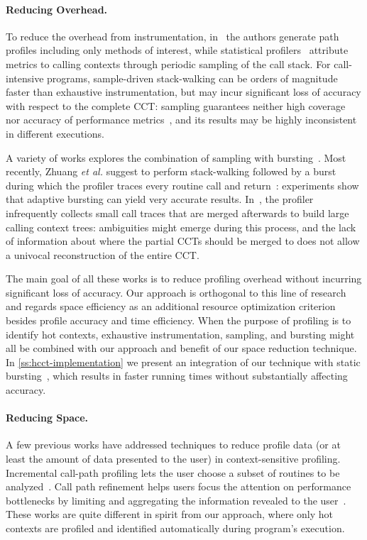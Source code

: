 \paragraph*{Reducing Overhead.} To reduce the overhead from instrumentation, in~\cite{Bernat07} the authors generate path profiles including only methods of interest, while statistical profilers~\cite{Arnold00,Froyd05,Hall93,Whaley00} attribute metrics to calling contexts through periodic sampling of the call stack. For call-intensive programs, sample-driven stack-walking can be orders of magnitude faster than exhaustive instrumentation, but may incur significant loss of accuracy with respect to the complete CCT: sampling guarantees neither high coverage~\cite{Bond07} nor accuracy of performance metrics~\cite{Zhuang06}, and its results may be highly inconsistent in different executions.

\noindent A variety of works explores the combination of sampling with bursting~\cite{Arnold01,Hirzel01,Zhuang06}. Most recently, Zhuang {\em et al.} suggest to perform stack-walking followed by a burst during which the profiler traces every routine call and return~\cite{Zhuang06}: experiments show that adaptive bursting can yield very accurate results. In~\cite{Serrano09}, the profiler infrequently collects small call traces that are merged afterwards to build large calling context trees: ambiguities might emerge during this process, and the lack of information about where the partial CCTs should be merged to does not allow a univocal reconstruction of the entire CCT.

The main goal of all these works is to reduce profiling overhead without incurring significant loss of accuracy. Our approach is orthogonal to this line of research and regards space efficiency as an additional resource optimization criterion besides profile accuracy and time efficiency. When the purpose of profiling is to identify hot contexts, exhaustive instrumentation, sampling, and bursting might all be combined with our approach and benefit of our space reduction technique. In \mysection\ref{ss:hcct-implementation} we present an integration of our technique with static bursting~\cite{Zhuang06}, which results in faster running times without substantially affecting accuracy.

\paragraph*{Reducing Space.} A few previous works have addressed techniques to reduce profile data (or at least the amount of data presented to the user) in context-sensitive profiling. Incremental call-path profiling lets the user choose a subset of routines to be analyzed~\cite{Bernat07}. Call path refinement helps users focus the attention on performance bottlenecks by limiting and aggregating the information revealed to the user~\cite{Hall95}. These works are quite different in spirit from our approach, where only hot contexts are profiled and identified automatically during program's execution.

